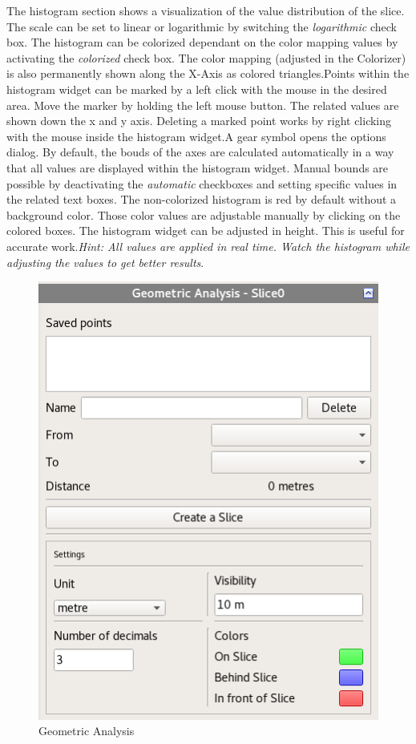 The histogram section shows a visualization of the value distribution of the slice. The scale can be set to linear or logarithmic by switching the \emph{logarithmic} check box. 
\newline The histogram can be colorized dependant on the color mapping values by activating the \emph{colorized} check box. The color mapping (adjusted in the Colorizer) is also permanently shown along the X-Axis as colored triangles.\newline Points within the histogram widget can be marked by a left click with the mouse in the desired area. Move the marker by holding the left mouse button. The related values are shown down the x and y axis. Deleting a marked point works by right clicking with the mouse inside the histogram widget.\newline A gear symbol opens the options dialog. By default, the bouds of the axes are calculated automatically in a way that all values are displayed within the histogram widget. Manual bounds are possible by deactivating the \emph{automatic} checkboxes and setting specific values in the related text boxes. \newline The non-colorized histogram is red by default without a background color. Those color values are adjustable manually by clicking on the colored boxes. \newline The histogram widget can be adjusted in height. This is useful for accurate work.\newline \emph{Hint: All values are applied in real time. Watch the histogram while adjusting the values to get better results}.
 
 \begin{figure}[h!]
  \centering
  \includegraphics[scale=0.5]{img/2d/geometricAnalysis}
  \caption{Geometric Analysis}
\end{figure}
